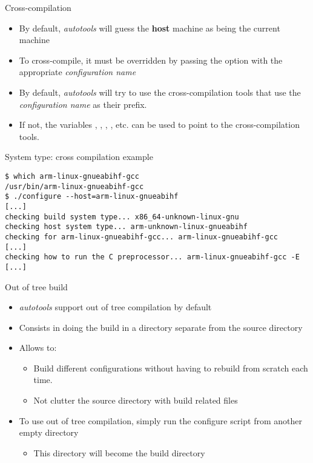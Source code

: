 \begin{frame}{Cross-compilation}
  \begin{itemize}
  \item By default, {\em autotools} will guess the {\bf host} machine
    as being the current machine
  \item To cross-compile, it must be overridden by passing the
     option with the appropriate {\em configuration name}
  \item By default, {\em autotools} will try to use the
    cross-compilation tools that use the {\em configuration name} as
    their prefix.
  \item If not, the variables , , ,
    , etc. can be used to point to the cross-compilation
    tools.
  \end{itemize}
\end{frame}

\begin{frame}[fragile]{System type: cross compilation example}

\begin{block}{}
{\scriptsize
\begin{verbatim}
$ which arm-linux-gnueabihf-gcc
/usr/bin/arm-linux-gnueabihf-gcc
$ ./configure --host=arm-linux-gnueabihf
[...]
checking build system type... x86_64-unknown-linux-gnu
checking host system type... arm-unknown-linux-gnueabihf
checking for arm-linux-gnueabihf-gcc... arm-linux-gnueabihf-gcc
[...]
checking how to run the C preprocessor... arm-linux-gnueabihf-gcc -E
[...]
\end{verbatim}}
\end{block}

\end{frame}

\begin{frame}{Out of tree build}
  \begin{itemize}
  \item {\em autotools} support out of tree compilation by default
  \item Consists in doing the build in a directory separate from the
    source directory
  \item Allows to:
    \begin{itemize}
    \item Build different configurations without having to rebuild
      from scratch each time.
    \item Not clutter the source directory with build related files
    \end{itemize}
  \item To use out of tree compilation, simply run the configure
    script from another empty directory
    \begin{itemize}
    \item This directory will become the build directory
    \end{itemize}
  \end{itemize}
\end{frame}

